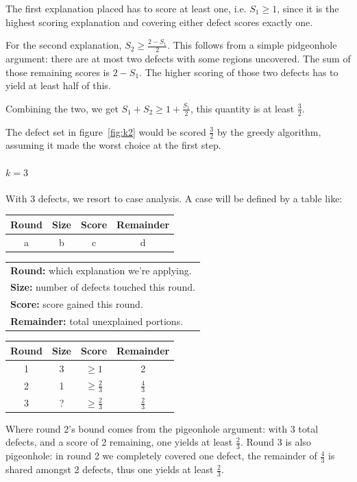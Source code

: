 The first explanation placed has to score at least one, i.e. $S_1 \geq 1$, since it is the highest scoring explanation and covering either defect scores exactly one.  

For the second explanation, $S_2 \geq \frac{2 - S_1}{2}$.  This follows from a simple pidgeonhole argument: there are at most two defects with some regions uncovered.  The sum of those remaining scores is $2 - S_1$.  The higher scoring of those two defects has to yield at least half of this.  

Combining the two, we get $S_1 + S_2 \geq 1 + \frac{S_1}{2}$, this quantity is at least $\frac32$. 

The defect set in figure~\ref{fig:k2} would be scored $\frac32$ by the greedy algorithm, assuming it made the worst choice at the first step.

\paragraph{\textbf{$k=3$}} 

With 3 defects, we resort to case analysis.  A case will be defined by a table like:

\begin{tabular}{cccc}\hline
Round & Size & Score & Remainder \\ \hline
a & b & c & d \\
\end{tabular}

\begin{tabular}{l}
{\bf Round:} which explanation we're applying. \\
{\bf Size:} number of defects touched this round.  \\
{\bf Score:} score gained this round.  \\
{\bf Remainder:} total unexplained portions. \\
\end{tabular}

\begin{tabular}{cccc}\hline
Round & Size & Score & Remainder \\ \hline
1 & 3 & $\geq 1$ & 2 \\
2 & 1 & $\geq \frac23$ & $\frac43$ \\
3 & ? & $\geq \frac23$ & $\frac23$ \\
\end{tabular}

Where round 2's bound comes from the pigeonhole argument: with 3 total defects, and a score of 2 remaining, one yields at least $\frac23$.  Round 3 is also pigeonhole: in round 2 we completely covered one defect, the remainder of $\frac43$ is shared amongst 2 defects, thus one yields at least $\frac23$.

